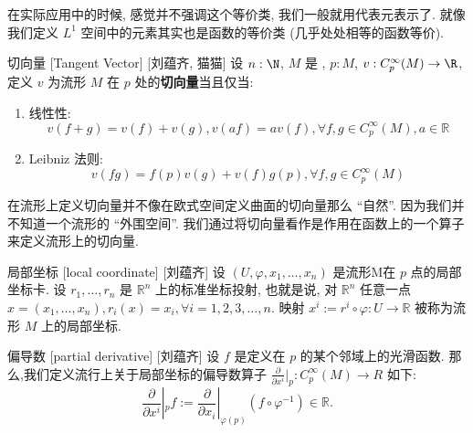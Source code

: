 \documentclass[UTF8]{ctexart}
\begin{document}
        \begin{rmk}
            [刘蕴齐]
            在实际应用中的时候, 感觉并不强调这个等价类, 我们一般就用代表元表示了. 就像我们定义 \(L^1\) 空间中的元素其实也是函数的等价类 (几乎处处相等的函数等价). 
        \end{rmk}

        \begin{dfn}
            {切向量}
            [Tangent Vector]
            [刘蕴齐, 猫猫]
            设 \(n:\N\), \(M\) 是 , \(p:M\), \(v:C_p^{\infty}(M)\to\R\), 定义 \(v\) 为流形 \(M\) 在 \(p\) 处的\textbf{切向量}当且仅当: 
            \begin{enumerate}
                \item 线性性: 
                \[v (f + g) =v( f ) + v( g ), v(a f) = av( f ), \forall f,g \in C_p^{\infty} (M), a \in \mathbb{R}\]
                \item Leibniz 法则: 
                \[v(fg) = f(p)v(g)+v(f)g(p), \forall f,g \in C_p^{\infty} (M)\]
            \end{enumerate}
        \end{dfn}

        \begin{rmk}
            [刘蕴齐]
            在流形上定义切向量并不像在欧式空间定义曲面的切向量那么 ``自然''. 因为我们并不知道一个流形的 ``外围空间''. 我们通过将切向量看作是作用在函数上的一个算子来定义流形上的切向量. 
        \end{rmk}

        \begin{dfn}
            []
            {局部坐标}
            [local coordinate]
            [刘蕴齐]
            设 \((U, \varphi, x_1, \dots, x_n)\) 是流形M在 \(p\) 点的局部坐标卡. 设 \(r_1, \dots, r_n \) 是 \(\mathbb{R}^n\) 上的标准坐标投射, 也就是说, 对 \(\mathbb{R}^n\) 任意一点  \(x = (x_1, \dots, x_n), r_i(x) = x_i, \forall i= 1,2,3, \dots, n\).
            映射 \(x^i:= r^i \circ \varphi: U \to \mathbb{R}\) 被称为流形 \(M\) 上的局部坐标. 
        \end{dfn}

        \begin{dfn}
            []
            {偏导数}
            [partial derivative]
            [刘蕴齐]
            设 \(f\) 是定义在 \(p\) 的某个邻域上的光滑函数.  
            那么,我们定义流行上关于局部坐标的偏导数算子 \(\frac{\partial}{\partial x^i} |_p: C_p^{\infty} (M) \to R\) 如下:
                \[
                \frac{\partial}{\partial x^i} |_p f:= \frac{\partial}{\partial x_i}|_{\varphi(p)} (f \circ \varphi^{-1} ) \in \mathbb{R}.
                \]
        \end{dfn}
\end{document}
